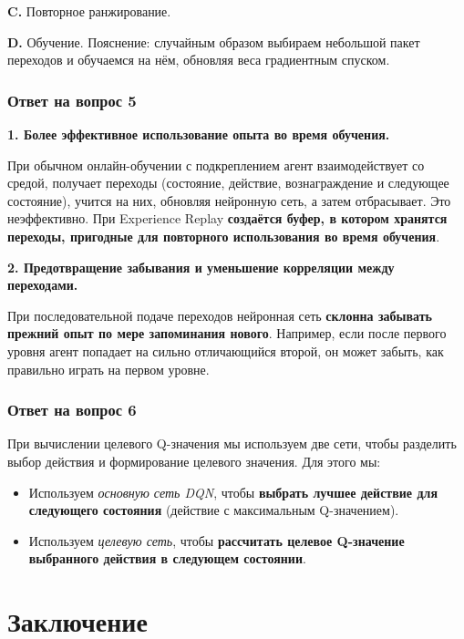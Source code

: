\documentclass[11pt,a4paper]{article}
\begin{document}
\textbf{C.} Повторное ранжирование.

\textbf{D.} Обучение. Пояснение: случайным образом выбираем небольшой пакет переходов и обучаемся на нём, обновляя веса градиентным спуском.

\subsubsection{Ответ на вопрос 5}\label{q5-solution}

\textbf{1. Более эффективное использование опыта во время обучения.}

При обычном онлайн-обучении с подкреплением агент взаимодействует со средой, получает переходы (состояние, действие, вознаграждение и следующее состояние), учится на них, обновляя нейронную сеть, а затем отбрасывает. Это неэффективно. При Experience Replay \textbf{создаётся буфер, в котором хранятся переходы, пригодные для повторного использования во время обучения}.

\textbf{2. Предотвращение забывания и уменьшение корреляции между переходами.}

При последовательной подаче переходов нейронная сеть \textbf{склонна забывать прежний опыт по мере запоминания нового}. Например, если после первого уровня агент попадает на сильно отличающийся второй, он может забыть, как правильно играть на первом уровне.

\subsubsection{Ответ на вопрос 6}\label{q6-solution}

При вычислении целевого Q-значения мы используем две сети, чтобы разделить выбор действия и формирование целевого значения. Для этого мы:

\begin{itemize}
\item
Используем \emph{основную сеть DQN}, чтобы \textbf{выбрать лучшее действие для следующего состояния} (действие с максимальным Q-значением).
\item
Используем \emph{целевую сеть}, чтобы \textbf{рассчитать целевое Q-значение выбранного действия в следующем состоянии}.
\end{itemize}

\section{Заключение}\label{conclusion}
\end{document}

